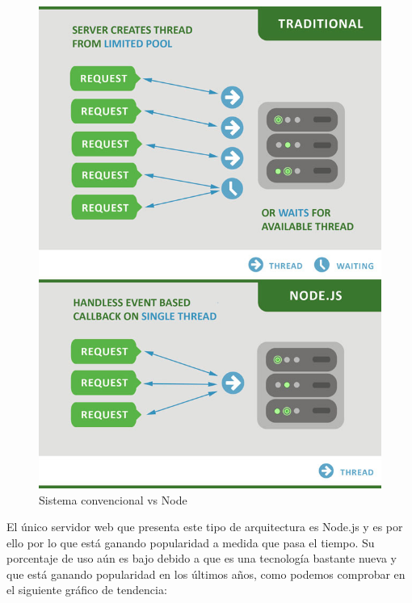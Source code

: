 \begin{figure}[H]
	\centering
	\includegraphics[scale=0.5]{imagenes/traditional-vs-nodejs.jpg}
	\caption{Sistema convencional vs Node \label{fig:figura3}}
\end{figure}

El único servidor web que presenta este tipo de arquitectura es Node.js y es por ello por lo que está
ganando popularidad a medida que pasa el tiempo. Su porcentaje de uso aún es bajo debido a que es una tecnología 
bastante nueva y que está ganando popularidad en los últimos años, como podemos comprobar en el siguiente gráfico
de tendencia:

